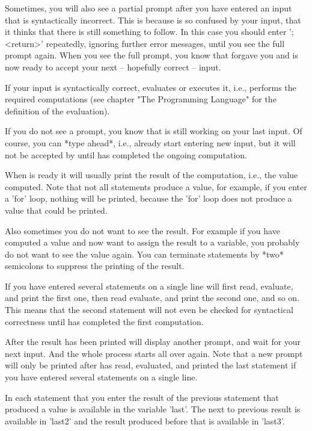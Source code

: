 Sometimes, you will also  see a partial prompt after  you have entered an
input  that is  syntactically incorrect.   This is  because  {\GAP} is so
confused by your  input, that it thinks that  there is still something to
follow.  In this case you  should enter ';<return>' repeatedly,  ignoring
further error messages,  until you see the full  prompt  again.  When you
see the full prompt, you know that {\GAP} forgave you and is now ready to
accept your next -- hopefully correct -- input.

If your input is syntactically correct, {\GAP} evaluates  or executes it,
i.e., performs the  required computations  (see chapter "The  Programming
Language" for the definition of the evaluation).

If you do not see a prompt, you know that {\GAP} is still working on your
last input.   Of  course,  you  can  *type ahead*,   i.e., already  start
entering new input, but it  will not be  accepted by {\GAP} until  {\GAP}
has completed the ongoing computation.

When {\GAP} is ready it will usually print the result of the computation,
i.e., the value computed.  Note that not  all statements produce a value,
for example, if you enter a 'for'  loop, nothing will be printed, because
the 'for' loop does not produce a value that could be printed.

Also  sometimes you do  not want to see the   result.  For example if you
have  computed a value and now  want to assign the  result to a variable,
you  probably do not   want to see the   value again.  You  can terminate
statements by *two* semicolons to suppress the printing of the result.

If you have entered several statements on a single line {\GAP} will first
read, evaluate, and  print the first one,  then read evaluate, and  print
the second one, and so on.  This means that the second statement will not
even be checked  for  syntactical correctness until {\GAP}  has completed
the first computation.

After the result has been printed {\GAP} will display another prompt, and
wait for your next input.  And  the whole process  starts all over again.
Note that a  new  prompt will  only  be  printed after  {\GAP} has  read,
evaluated, and printed the  last  statement if  you have entered  several
statements on a single line.

In each statement  that you  enter the  result of  the previous statement
that produced  a value is available in  the variable 'last'.  The next to
previous result is available in  'last2' and  the result produced  before
that is available in 'last3'.

